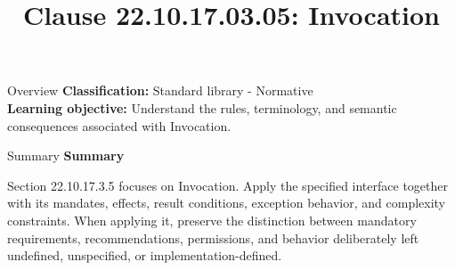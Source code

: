 \documentclass[10pt,letterpaper]{article}
\title{Clause 22.10.17.03.05: Invocation}
\author{}
\date{}
\begin{document}
\maketitle
\begin{CornellOverviewBox}{Overview}
\textbf{Classification:} Standard library - Normative\\[2pt]
\textbf{Learning objective:} Understand the rules, terminology, and semantic consequences associated with Invocation.
\end{CornellOverviewBox}\begin{CornellSummaryBox}{Summary}
{\sffamily\bfseries\color{Accent} Summary}\par\vspace{3pt}Section 22.10.17.3.5 focuses on Invocation. Apply the specified interface together with its mandates, effects, result conditions, exception behavior, and complexity constraints. When applying it, preserve the distinction between mandatory requirements, recommendations, permissions, and behavior deliberately left undefined, unspecified, or implementation-defined.
\end{CornellSummaryBox}
\end{document}
